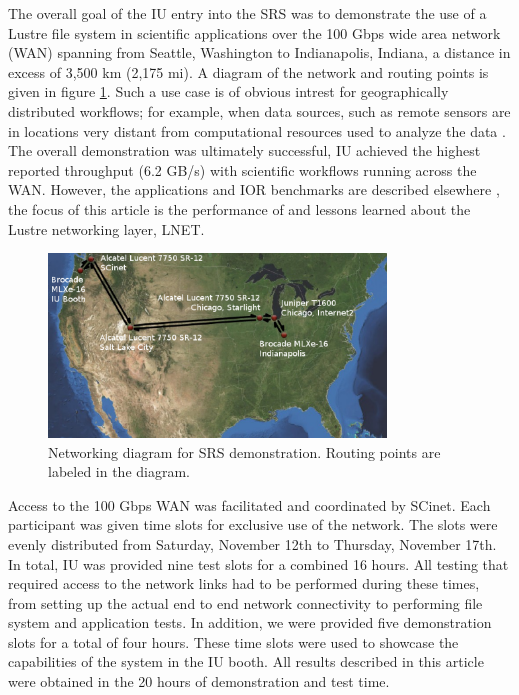 \documentclass[]{sig-alternate}
\begin{document}
The overall goal of the IU entry into the SRS was to demonstrate the use of a Lustre file system in scientific
applications over the 100 Gbps wide area network (WAN) spanning from Seattle, Washington to Indianapolis,
Indiana, a distance in excess of 3,500 km (2,175 mi). A diagram of the network and routing points is given in
figure \ref{fig:network}. Such a use case is of obvious intrest for geographically distributed workflows; for
example, when data sources, such as remote sensors are in locations very distant from computational resources
used to analyze the data \cite{henschel2010}. The overall demonstration was ultimately successful, IU
achieved the highest reported throughput (6.2 GB/s) with scientific workflows running across the
WAN. However, the applications and IOR benchmarks are described elsewhere \cite{henschel2012}, the
focus of this article is the performance of and lessons learned about the Lustre networking layer, LNET.

\begin{figure}[t]
\begin{center}
\includegraphics[width=0.80\textwidth]{figures/network.eps}
\caption{Networking diagram for SRS demonstration. Routing points are labeled in the diagram.}
\label{fig:network}
\end{center}
\end{figure}

Access to the 100 Gbps WAN was facilitated and coordinated by SCinet. Each participant was given time slots
for exclusive use of the network. The slots were evenly distributed from Saturday, November 12th to Thursday,
November 17th. In total, IU was provided nine test slots for a combined 16 hours. All testing that required
access to the network links had to be performed during these times, from setting up the actual end to end
network connectivity to performing file system and application tests. In addition, we were provided five
demonstration slots for a total of four hours. These time slots were used to showcase the capabilities of the
system in the IU booth. All results described in this article were obtained in the 20 hours of demonstration
and test time.
\end{document}
